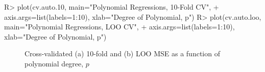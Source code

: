 \documentclass[
]{jss}
\begin{document}
\begin{CodeChunk}
\begin{CodeInput}
R> plot(cv.auto.10, main="Polynomial Regressions, 10-Fold CV",
+      axis.args=list(labels=1:10), xlab="Degree of Polynomial, p")
R> plot(cv.auto.loo, main="Polynomial Regressions, LOO CV",
+      axis.args=list(labels=1:10), xlab="Degree of Polynomial, p")
\end{CodeInput}
\begin{figure}

{\centering {}

}

\caption[Cross-validated (a) 10-fold and (b) LOO MSE as a function of polynomial degree, $p$]{Cross-validated (a) 10-fold and (b) LOO MSE as a function of polynomial degree, $p$}\label{fig:polynomial-regression-CV-graph-2}
\end{figure}
\end{CodeChunk}
\end{document}
